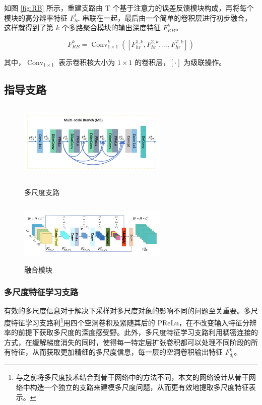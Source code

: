 \documentclass[14px]{article}
\begin{document}
如图 \ref{fig:RB} 所示，重建支路由 T 个基于注意力的误差反馈模块构成，再将每个模块的高分辨率特征 $F_{h r}^{t}$ 串联在一起，最后由一个简单的卷积层进行初步融合，这样就得到了第 $k$ 个多路聚合模块的输出深度特征 $F_{R B}^{k}$。

\begin{equation}
F_{R B}^{k}=\operatorname{Conv}_{1 \times 1}^{k}\left(\left[F_{h r}^{1, k}, F_{h r}^{2, k}, \ldots, F_{h r}^{T, k}\right]\right)
\end{equation}

其中，$\operatorname{Conv}_{1 \times 1}$ 表示卷积核大小为 $1 \times 1$ 的卷积层，$[\cdot]$ 为级联操作。

\subsection{指导支路}

\begin{figure}[!htbp]
	\begin{minipage}[t]{0.5\linewidth}
		\centering
		\includegraphics[height=1.5in,width=2.8in]{img/MB}
		\caption{多尺度支路}
		\label{fig:MB}
	\end{minipage}
	\begin{minipage}[t]{0.5\linewidth}
		\centering
		\includegraphics[height=1.2in,width=2.8in]{img/FB}
		\caption{融合模块}
		\label{fig:FB}
	\end{minipage}
\end{figure}



\subsubsection{多尺度特征学习支路}

有效的多尺度信息对于解决下采样对多尺度对象的影响不同的问题至关重要。多尺度特征学习支路利\footnote{与之前将多尺度技术结合到骨干网络中的方法不同，本文的网络设计从骨干网络中构造一个独立的支路来建模多尺度问题，从而更有效地提取多尺度特征表示。}用四个空洞卷积及紧随其后的 PReLu，在不改变输入特征分辨率的前提下获取多尺度的深度感受野。此外，多尺度特征学习支路利用稠密连接的方式，在缓解梯度消失的同时，使得每一特定层扩张卷积都可以处理不同阶段的所有特征，从而获取更加精细的多尺度信息，每一层的空洞卷积输出特征 $F_{d_{i}}^{k}$。
\end{document}
